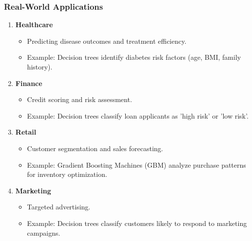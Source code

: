 \documentclass[aspectratio=169]{beamer}
\begin{document}
\begin{frame}[fragile]
    \frametitle{Real-World Applications}
    \begin{enumerate}
        \item \textbf{Healthcare}
        \begin{itemize}
            \item Predicting disease outcomes and treatment efficiency.
            \item Example: Decision trees identify diabetes risk factors (age, BMI, family history).
        \end{itemize}
        
        \item \textbf{Finance}
        \begin{itemize}
            \item Credit scoring and risk assessment.
            \item Example: Decision trees classify loan applicants as 'high risk' or 'low risk'.
        \end{itemize}

        \item \textbf{Retail}
        \begin{itemize}
            \item Customer segmentation and sales forecasting.
            \item Example: Gradient Boosting Machines (GBM) analyze purchase patterns for inventory optimization.
        \end{itemize}

        \item \textbf{Marketing}
        \begin{itemize}
            \item Targeted advertising.
            \item Example: Decision trees classify customers likely to respond to marketing campaigns.
        \end{itemize}
    \end{enumerate}
\end{frame}
\end{document}
